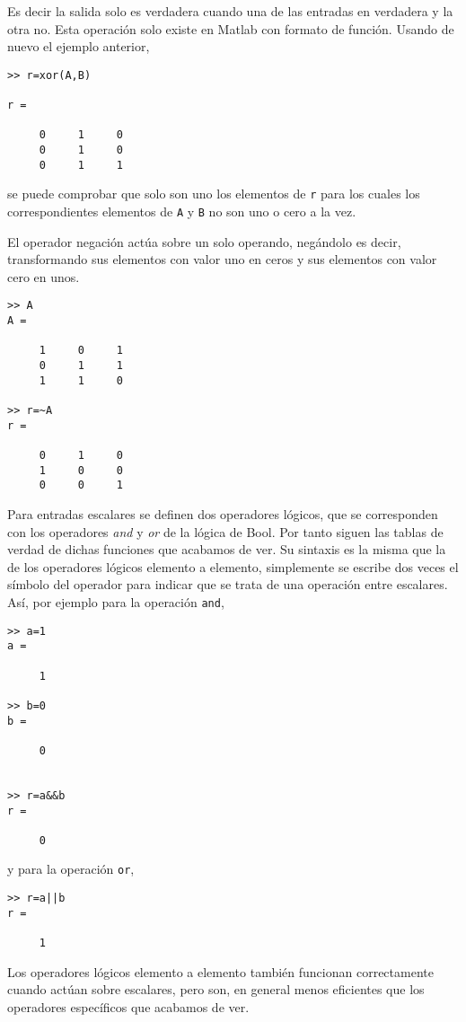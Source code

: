 Es decir la salida solo es verdadera cuando una de las entradas en verdadera y la otra no. Esta operación solo existe en Matlab con formato de función. Usando de nuevo el ejemplo anterior,

\begin{verbatim}
>> r=xor(A,B)

r =

     0     1     0
     0     1     0
     0     1     1
\end{verbatim}

se puede comprobar que solo son uno los elementos de \texttt{r} para los cuales los correspondientes elementos de \texttt{A} y \texttt{B} no son uno o cero a la vez.

El operador negación actúa sobre un solo operando, negándolo es decir, transformando sus elementos con valor uno en ceros y sus elementos con valor cero en unos.

\begin{verbatim}
>> A
A =

     1     0     1
     0     1     1
     1     1     0

>> r=~A
r =

     0     1     0
     1     0     0
     0     0     1

\end{verbatim}

Para entradas escalares se definen dos operadores lógicos, que se corresponden con los operadores \emph{and} y \emph{or} de la lógica de Bool. Por tanto siguen las tablas de verdad de dichas funciones que acabamos de ver. Su sintaxis es la misma que la de los operadores lógicos elemento a elemento, simplemente se escribe dos veces el símbolo del operador para indicar que se trata de una operación entre escalares. Así, por ejemplo para la operación \texttt{and},
\begin{verbatim}
>> a=1
a =

     1

>> b=0
b =

     0


>> r=a&&b
r =

     0
\end{verbatim}
 y para la operación \texttt{or},
 
\begin{verbatim}
>> r=a||b
r =

     1
\end{verbatim}

Los operadores lógicos elemento a elemento también funcionan correctamente cuando actúan sobre escalares, pero son, en general menos eficientes que los operadores específicos que acabamos de ver.

